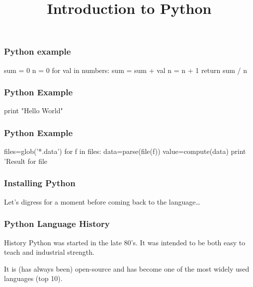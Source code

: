 
\title{Introduction to Python}




\begin{frame}[fragile]
\frametitle{Python example}

\begin{python}
sum = 0
n = 0
for val in numbers:
    sum = sum + val
    n = n + 1
return sum / n
\end{python}

\end{frame}

\begin{frame}[fragile]
\frametitle{Python Example}

\begin{python}
print "Hello World"
\end{python}
\end{frame}

\begin{frame}[fragile]
\frametitle{Python Example}

\begin{python}
files=glob('*.data')
for f in files:
    data=parse(file(f))
    value=compute(data)
    print 'Result for file %
\end{python}
\end{frame}

\begin{frame}[fragile]
\frametitle{Installing Python}

Let's digress for a moment before coming back to the language\ldots
\end{frame}


\begin{frame}[fragile]
\frametitle{Python Language History}

\begin{block}{History}
Python was started in the late 80's. It was intended to be both \alert{easy to teach} and \alert{industrial strength}.

It is (has always been) open-source and has become one of the most widely used languages (top 10).
\end{block}
\end{frame}

